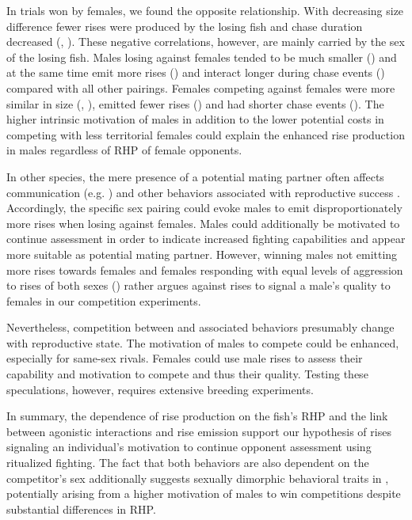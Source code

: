 In trials won by females, we found the opposite relationship. With decreasing size difference fewer rises were produced by the losing fish and chase duration decreased (, ). These negative correlations, however, are mainly carried by the sex of the losing fish. Males losing against females tended to be much smaller () and at the same time emit more rises () and interact longer during chase events () compared with all other pairings. Females competing against females were more similar in size (, ), emitted fewer rises () and had shorter chase events (). The higher intrinsic motivation of males in addition to the lower potential costs in competing with less territorial females could explain the enhanced rise production in males regardless of RHP of female opponents.

In other species, the mere presence of a potential mating partner often affects communication (e.g. \citealp{Barske2015}) and other behaviors associated with reproductive success \citep{Taylor1975}. Accordingly, the specific sex pairing could evoke males to emit
disproportionately more rises when losing against females. Males could additionally be motivated to continue assessment in order to indicate increased fighting capabilities and appear more suitable as potential mating partner. However, winning males not emitting
more rises towards females and females responding with equal levels of aggression to rises of both sexes () rather argues against rises to signal a male's quality to females in our competition experiments.

Nevertheless, competition between \lepto{} and associated behaviors presumably change with reproductive state. The motivation of males to compete could be enhanced, especially for same-sex rivals. Females could use male rises to assess their capability and motivation to compete and thus their quality. Testing these speculations, however, requires extensive breeding experiments.

In summary, the dependence of rise production on the fish's RHP and the link between agonistic interactions and rise emission support our hypothesis of rises signaling an individual's motivation to continue opponent assessment using ritualized fighting. The fact
that both behaviors are also dependent on the competitor's sex additionally suggests sexually dimorphic behavioral traits in \lepto{}, potentially arising from a higher motivation of males to win competitions despite substantial differences in RHP.

